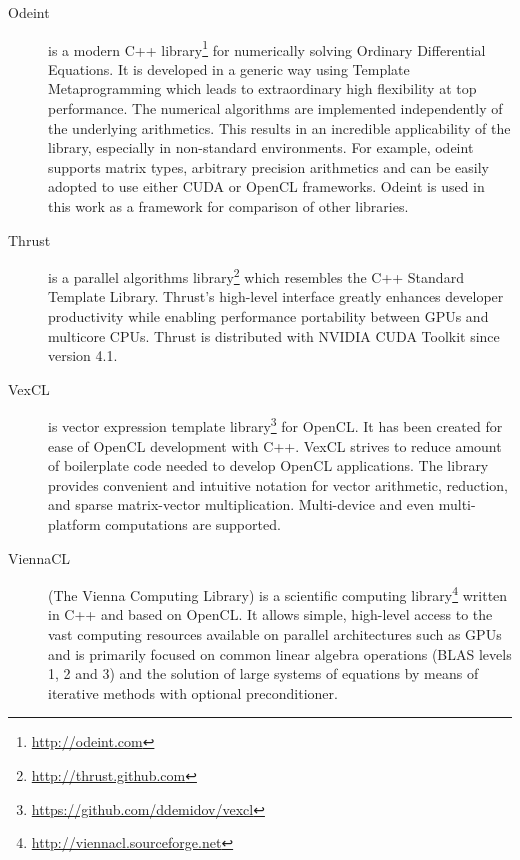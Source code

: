\documentclass[1p]{elsarticle}
\begin{document}
\begin{description}
    \item[Odeint] is a modern C++
        library\footnote{\href{http://odeint.com}{http://odeint.com}} for
        numerically solving Ordinary Differential Equations. It is developed in
        a generic way using Template Metaprogramming which leads to
        extraordinary high flexibility at top performance. The numerical
        algorithms are implemented independently of the underlying arithmetics.
        This results in an incredible applicability of the library, especially
        in non-standard environments. For example, odeint supports matrix
        types, arbitrary precision arithmetics and can be easily adopted to use
        either CUDA or OpenCL frameworks.  Odeint is used in this work as a
        framework for comparison of other libraries.
    \item[Thrust] is a parallel algorithms
        library\footnote{\href{http://thrust.github.com}{http://thrust.github.com}}
        which resembles the C++ Standard Template Library. Thrust's high-level
        interface greatly enhances developer productivity while enabling
        performance portability between GPUs and multicore CPUs. Thrust is
        distributed with NVIDIA CUDA Toolkit since version 4.1.
    \item[VexCL] is vector expression template
        library\footnote{\href{https://github.com/ddemidov/vexcl}{https://github.com/ddemidov/vexcl}}
        for OpenCL. It has been created for ease of OpenCL development with
        C++.  VexCL strives to reduce amount of boilerplate code needed to
        develop OpenCL applications. The library provides convenient and
        intuitive notation for vector arithmetic, reduction, and sparse
        matrix-vector multiplication.  Multi-device and even multi-platform
        computations are supported. 
    \item[ViennaCL] (The Vienna Computing Library) is a scientific computing
        library\footnote{\href{http://viennacl.sourceforge.net}{http://viennacl.sourceforge.net}}
        written in C++ and based on OpenCL. It allows simple, high-level access
        to the vast computing resources available on parallel architectures
        such as GPUs and is primarily focused on common linear algebra
        operations (BLAS levels 1, 2 and 3) and the solution of large systems
        of equations by means of iterative methods with optional
        preconditioner.
\end{description}
\end{document}
